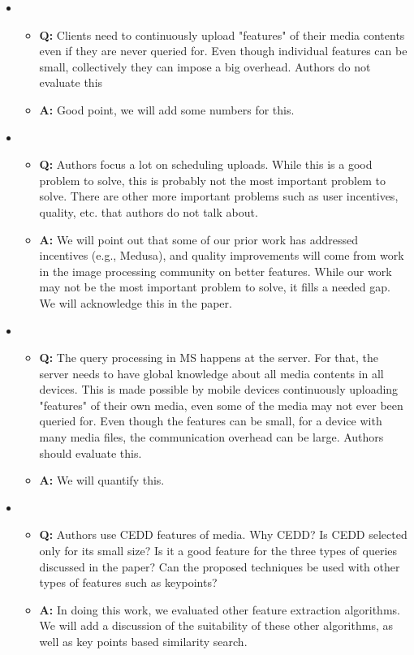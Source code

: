 \begin{itemize}
\item
\begin{itemize}
\item \textbf{Q: } Clients need to continuously upload "features" of
  their media contents even if they are never queried for.  Even
  though individual features can be small, collectively they can
  impose a big overhead. Authors do not evaluate this
\item \textbf{A: } Good point, we will add some numbers for this.
\end{itemize}
\item
\begin{itemize}
\item \textbf{Q: }Authors focus a lot on scheduling uploads. While
  this is a good problem to solve, this is probably not the most
  important problem to solve. There are other more important problems
  such as user incentives, quality, etc. that authors do not talk
  about.
\item \textbf{A: }We will point out that some of our prior work has
  addressed incentives (e.g., Medusa), and quality improvements will
  come from work in the image processing community on better
  features. While our work may not be the most important problem to
  solve, it fills a needed gap. We will acknowledge this in the paper.
\end{itemize}


\item
\begin{itemize}
\item \textbf{Q: }The query processing in MS happens at the
  server. For that, the server needs to have global knowledge about
  all media contents in all devices. This is made possible by mobile
  devices continuously uploading "features" of their own media, even
  some of the media may not ever been queried for. Even though the
  features can be small, for a device with many media files, the
  communication overhead can be large. Authors should evaluate this.
\item \textbf{A: } We will quantify this.
\end{itemize}

\item
\begin{itemize}
\item \textbf{Q: } Authors use CEDD features of media. Why CEDD? Is
  CEDD selected only for its small size? Is it a good feature for the
  three types of queries discussed in the paper? Can the proposed
  techniques be used with other types of features such as keypoints?
\item \textbf{A: } In doing this work, we evaluated other feature
  extraction algorithms. We will add a discussion of the suitability
  of these other algorithms, as well as key points based similarity
  search.
\end{itemize}
   

\end{itemize}
